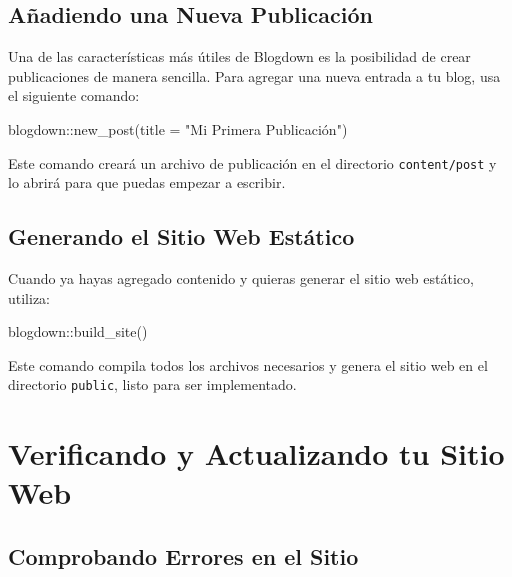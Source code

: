 \documentclass[
  doc,
  floatsintext,
  longtable,
  a4paper,
  nolmodern,
  notxfonts,
  notimes,
  colorlinks=true,linkcolor=blue,citecolor=blue,urlcolor=blue]{apa7}
\newenvironment{Shaded}{\begin{snugshade}}{\end{snugshade}}
\newcommand{\AttributeTok}[1]{\textcolor[rgb]{0.40,0.45,0.13}{#1}}
\newcommand{\FunctionTok}[1]{\textcolor[rgb]{0.28,0.35,0.67}{#1}}
\newcommand{\NormalTok}[1]{\textcolor[rgb]{0.00,0.23,0.31}{#1}}
\newcommand{\SpecialCharTok}[1]{\textcolor[rgb]{0.37,0.37,0.37}{#1}}
\newcommand{\StringTok}[1]{\textcolor[rgb]{0.13,0.47,0.30}{#1}}
\begin{document}
\subsection{Añadiendo una Nueva
Publicación}\label{auxf1adiendo-una-nueva-publicaciuxf3n}

Una de las características más útiles de Blogdown es la posibilidad de
crear publicaciones de manera sencilla. Para agregar una nueva entrada a
tu blog, usa el siguiente comando:

\begin{Shaded}
\begin{Highlighting}[]
\NormalTok{blogdown}\SpecialCharTok{::}\FunctionTok{new\_post}\NormalTok{(}\AttributeTok{title =} \StringTok{"Mi Primera Publicación"}\NormalTok{)}
\end{Highlighting}
\end{Shaded}

Este comando creará un archivo de publicación en el directorio
\texttt{content/post} y lo abrirá para que puedas empezar a escribir.

\subsection{Generando el Sitio Web
Estático}\label{generando-el-sitio-web-estuxe1tico}

Cuando ya hayas agregado contenido y quieras generar el sitio web
estático, utiliza:

\begin{Shaded}
\begin{Highlighting}[]
\NormalTok{blogdown}\SpecialCharTok{::}\FunctionTok{build\_site}\NormalTok{()}
\end{Highlighting}
\end{Shaded}

Este comando compila todos los archivos necesarios y genera el sitio web
en el directorio \texttt{public}, listo para ser implementado.

\section{Verificando y Actualizando tu Sitio
Web}\label{verificando-y-actualizando-tu-sitio-web}

\subsection{Comprobando Errores en el
Sitio}\label{comprobando-errores-en-el-sitio}
\end{document}
